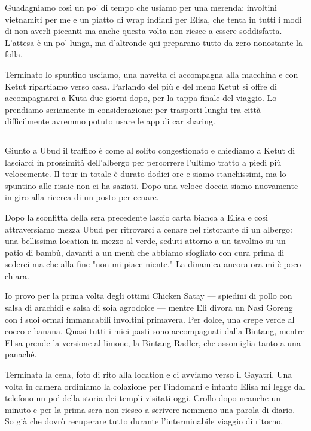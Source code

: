 Guadagniamo così un po' di tempo che usiamo per una merenda: involtini vietnamiti per me e un piatto di wrap indiani per Elisa, che tenta in tutti i modi di non averli piccanti ma anche questa volta non riesce a essere soddisfatta. L'attesa è un po' lunga, ma d'altronde qui preparano tutto da zero nonostante la folla.

Terminato lo spuntino usciamo, una navetta ci accompagna alla macchina e con Ketut ripartiamo verso casa. Parlando del più e del meno Ketut si offre di accompagnarci a Kuta due giorni dopo, per la tappa finale del viaggio. Lo prendiamo seriamente in considerazione: per trasporti lunghi tra città difficilmente avremmo potuto usare le app di car sharing.

\begin{center}
    \noindent\rule{0.6\textwidth}{0.4pt}
\end{center}

Giunto a Ubud il traffico è come al solito congestionato e chiediamo a Ketut di lasciarci in prossimità dell'albergo per percorrere l'ultimo tratto a piedi più velocemente. Il tour in totale è durato dodici ore e siamo stanchissimi, ma lo spuntino alle risaie non ci ha saziati. Dopo una veloce doccia siamo nuovamente in giro alla ricerca di un posto per cenare.

Dopo la sconfitta della sera precedente lascio carta bianca a Elisa e così attraversiamo mezza Ubud per ritrovarci a cenare nel ristorante di un albergo: una bellissima location in mezzo al verde, seduti attorno a un tavolino su un patio di bambù, davanti a un menù che abbiamo sfogliato con cura prima di sederci ma che alla fine "non mi piace niente." La dinamica ancora ora mi è poco chiara.

Io provo per la prima volta degli ottimi Chicken Satay — spiedini di pollo con salsa di arachidi e salsa di soia agrodolce — mentre Eli divora un Nasi Goreng con i suoi ormai immancabili involtini primavera. Per dolce, una crepe verde al cocco e banana. Quasi tutti i miei pasti sono accompagnati dalla Bintang, mentre Elisa prende la versione al limone, la Bintang Radler, che assomiglia tanto a una panaché.

Terminata la cena, foto di rito alla location e ci avviamo verso il Gayatri. Una volta in camera ordiniamo la colazione per l'indomani e intanto Elisa mi legge dal telefono un po' della storia dei templi visitati oggi. Crollo dopo neanche un minuto e per la prima sera non riesco a scrivere nemmeno una parola di diario. So già che dovrò recuperare tutto durante l'interminabile viaggio di ritorno.


